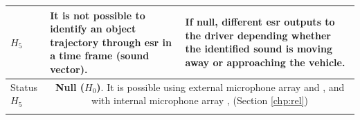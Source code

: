 \begin{table}[ht!]
\begin{tabular}{p{1.7cm}|p{6.5cm}|p{6.5cm}}
        $H_5$ & 
        It is not possible to identify an object trajectory through \gls{esr} in a time frame (sound vector). & 
        If null, different \gls{esr} outputs to the driver depending whether the identified sound is moving away or approaching the vehicle.\\
        \hline
        \rowcolor{gray!20} Status $H_5$ & \multicolumn{2}{c}{\parbox{13.4cm}{\textbf{Null ($H_0$)}. It is possible using external microphone array \cite{Marchegiani2022} and \cite{Sun2021}, and with internal microphone array \cite{Shabtai2019}, (Section \ref{chp:rel}) }} \\           
        \Xhline{2\arrayrulewidth}
    \end{tabular}
\end{table}

